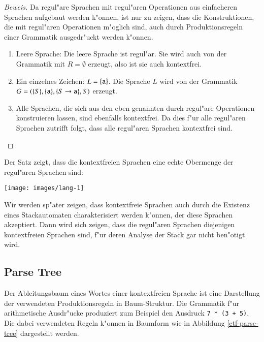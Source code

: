 \begin{proof}[Beweis]
Da regul"are Sprachen mit regul"aren Operationen aus einfacheren
Sprachen aufgebaut werden k"onnen, ist nur zu zeigen, dass die
Konstruktionen, die mit regul"aren Operationen m"oglich sind,
auch durch Produktionsregeln einer Grammatik ausgedr"uckt werden
k"onnen. 
\begin{enumerate}
\item Leere Sprache: Die leere Sprache ist regul"ar. Sie wird auch 
von der Grammatik mit $R=\emptyset$ erzeugt, also ist sie auch
kontextfrei.
\item Ein einzelnes Zeichen: $L=\{{\tt a}\}$. Die Sprache $L$ wird von
der Grammatik $G=(\{S\}, \{{\tt a}\}, \{S\to{\tt a}\}, S)$
erzeugt.
\item Alle Sprachen, die sich aus den eben genannten durch regul"are
Operationen konstruieren lassen, sind ebenfalls kontextfrei. Da
dies f"ur alle regul"aren Sprachen zutrifft folgt, dass alle
regul"aren Sprachen kontextfrei sind.
\end{enumerate}
\end{proof}

Der Satz zeigt, dass die kontextfreien Sprachen eine echte
Obermenge der regul"aren Sprachen sind:
\begin{center}
\texttt{[image: images/lang-1]}
\end{center}
Wir werden sp"ater zeigen, dass kontextfreie Sprachen auch durch
die Existenz eines Stackautomaten charakterisiert werden k"onnen,
der diese Sprachen akzeptiert. Dann wird sich zeigen, dass 
die regul"aren Sprachen diejenigen kontextfreien Sprachen sind,
f"ur deren Analyse der Stack gar nicht ben"otigt wird.

\subsection{Parse Tree}
Der Ableitungsbaum eines Wortes einer kontextfreien Sprache
ist eine Darstellung der verwendeten Produktionsregeln in Baum-Struktur.
Die Grammatik f"ur arithmetische Ausdr"ucke produziert zum Beispiel
den Ausdruck {\tt 7 * (3 + 5)}.
Die dabei verwendeten Regeln k"onnen in Baumform wie in
Abbildung \ref{etf-parse-tree} dargestellt werden.

